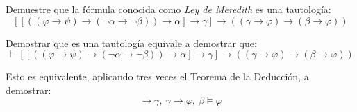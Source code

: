 \begin{ejercicio}\label{ej:1.3.5}
    Demuestre que la fórmula conocida como \emph{Ley de Meredith} es una tautología:
    \begin{equation*}
        \left[[\left((\varphi\rightarrow \psi)\rightarrow (\lnot \alpha\rightarrow\lnot \beta)\right)\rightarrow\alpha]\rightarrow \gamma\right] \rightarrow \left((\gamma\rightarrow\varphi)\rightarrow(\beta\rightarrow\varphi)\right)
    \end{equation*}

    Demostrar que es una tautología equivale a demostrar que:
    \begin{equation*}
        \vDash \left[[\left((\varphi\rightarrow \psi)\rightarrow (\lnot \alpha\rightarrow\lnot \beta)\right)\rightarrow\alpha]\rightarrow \gamma\right] \rightarrow \left((\gamma\rightarrow\varphi)\rightarrow(\beta\rightarrow\varphi)\right)
    \end{equation*}

    Esto es equivalente, aplicando tres veces el Teorema de la Deducción, a demostrar:
    \begin{equation*}
        [\left((\varphi\rightarrow \psi)\rightarrow (\lnot \alpha\rightarrow\lnot \beta)\right)\rightarrow\alpha]\rightarrow \gamma,~\gamma\rightarrow\varphi,~\beta \vDash \varphi
    \end{equation*}


\end{ejercicio}
